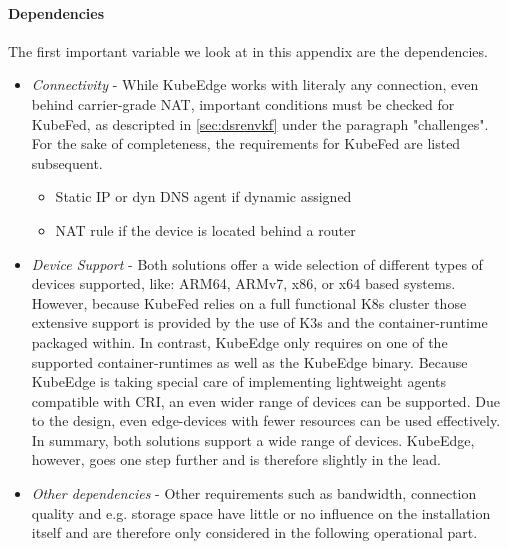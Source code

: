 \documentclass[MSC,Master,english]{twbook}%
\begin{document}
\paragraph{Dependencies} The first important variable we look at in this appendix are the dependencies.

\begin{itemize}
    \item \textit{Connectivity} - While KubeEdge works with literaly any connection, even behind carrier-grade \ac{NAT}\cite{cg-nat}, important conditions must be checked for KubeFed, as descripted in \autoref{sec:dsrenvkf} under the paragraph "challenges". For the sake of completeness, the requirements for KubeFed are listed subsequent.
    \begin{itemize}
        \item Static \ac{IP} or dyn \ac{DNS} agent if dynamic assigned
        \item \ac{NAT} rule if the device is located behind a router
    \end{itemize}
    \item \textit{Device Support} - Both solutions offer a wide selection of different types of devices supported, like: ARM64, ARMv7, x86, or x64 based systems. However, because \ac{KubeFed} relies on a full functional \ac{K8s} cluster those extensive support is provided by the use of K3s and the container-runtime packaged within. In contrast, KubeEdge only requires on one of the supported container-runtimes as well as the KubeEdge binary. Because KubeEdge is taking special care of implementing lightweight agents compatible with \ac{CRI}\cite{k8scri}\cite{ke-cri-gh}, an even wider range of devices can be supported. Due to the design, even edge-devices with fewer resources can be used effectively. In summary, both solutions support a wide range of devices. KubeEdge, however, goes one step further and is therefore slightly in the lead.
    \item \textit{Other dependencies} - Other requirements such as bandwidth, connection quality and e.g. storage space have little or no influence on the installation itself and are therefore only considered in the following operational part.
\end{itemize}
\end{document}
